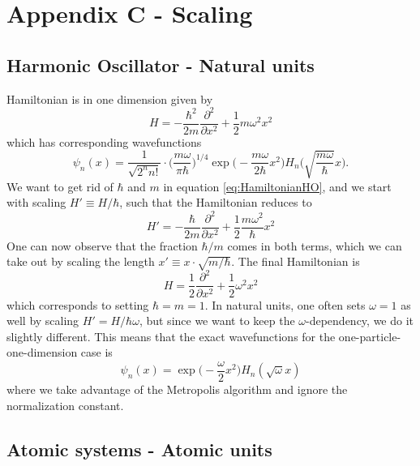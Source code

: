 \section{Appendix C - Scaling}

\subsection{Harmonic Oscillator - Natural units}
Hamiltonian is in one dimension given by
\begin{equation}
H=-\frac{\hbar^2}{2m}\frac{\partial^2}{\partial x^2}+\frac{1}{2}m\omega^2x^2
\label{eq:HamiltonianHO}
\end{equation}
which has corresponding wavefunctions
\begin{equation}
\psi_n(x)=\frac{1}{\sqrt{2^nn!}}\cdot\bigg(\frac{m\omega}{\pi\hbar}\bigg)^{1/4}\exp\Big(-\frac{m\omega}{2\hbar}x^2\Big)H_n\Big(\sqrt{\frac{m\omega}{\hbar}}x\Big).
\end{equation}
We want to get rid of $\hbar$ and $m$ in equation \eqref{eq:HamiltonianHO}, and we start with scaling $H'\equiv H/\hbar$, such that the Hamiltonian reduces to
\begin{equation}
H'=-\frac{\hbar}{2m}\frac{\partial^2}{\partial x^2}+\frac{1}{2}\frac{m\omega^2}{\hbar}x^2
\end{equation}
One can now observe that the fraction $\hbar/m$ comes in both terms, which we can take out by scaling the length $x'\equiv x\cdot\sqrt{m/\hbar}$. The final Hamiltonian is
\begin{equation}
H=\frac{1}{2}\frac{\partial^2}{\partial x^2}+\frac{1}{2}\omega^2x^2
\end{equation}
which corresponds to setting $\hbar=m=1$. In natural units, one often sets $\omega=1$ as well by scaling $H'=H/\hbar\omega$, but since we want to keep the $\omega$-dependency, we do it slightly different. This means that the exact wavefunctions for the one-particle-one-dimension case is
\begin{equation}
\psi_n(x)=\exp\Big(-\frac{\omega}{2}x^2\Big)H_n(\sqrt{\omega}x)
\end{equation}
where we take advantage of the Metropolis algorithm and ignore the normalization constant. 

\subsection{Atomic systems - Atomic units}
